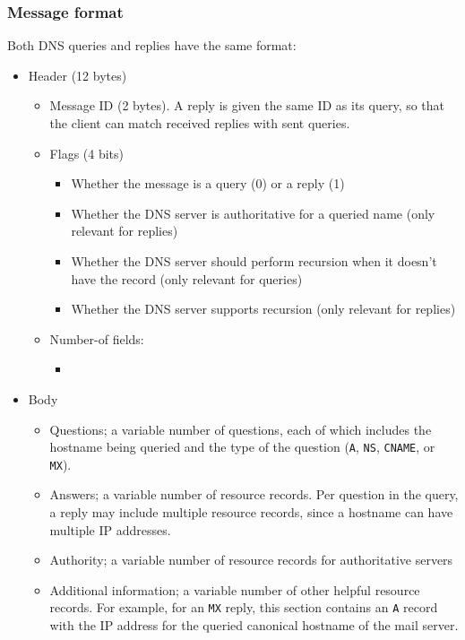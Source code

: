 \documentclass[table, xcdraw]{article}%
\begin{document}
\subsubsection{Message format}

Both DNS queries and replies have the same format:

\begin{itemize}
    \item Header (12 bytes)
    \begin{itemize}
        \item Message ID (2 bytes). A reply is given the same ID as its query, so that the client can match received replies with sent queries.
        \item Flags (4 bits)
        \begin{itemize}
            \item Whether the message is a query (0) or a reply (1)
            \item Whether the DNS server is authoritative for a queried name (only relevant for replies)
            \item Whether the DNS server should perform recursion when it doesn't have the record (only relevant for queries)
            \item Whether the DNS server supports recursion (only relevant for replies)
        \end{itemize}
        \item Number-of fields:
        \begin{itemize}
            \item 
        \end{itemize}
    \end{itemize}
    \item Body
    \begin{itemize}
        \item Questions; a variable number of questions, each of which includes the hostname being queried and the type of the question (\texttt{A}, \texttt{NS}, \texttt{CNAME}, or \texttt{MX}).
        \item Answers; a variable number of resource records. Per question in the query, a reply may include multiple resource records, since a hostname can have multiple IP addresses.
        \item Authority; a variable number of resource records for authoritative servers
        \item Additional information; a variable number of other helpful resource records. For example, for an \texttt{MX} reply, this section contains an \texttt{A} record with the IP address for the queried canonical hostname of the mail server.
    \end{itemize}
\end{itemize}
\end{document}
